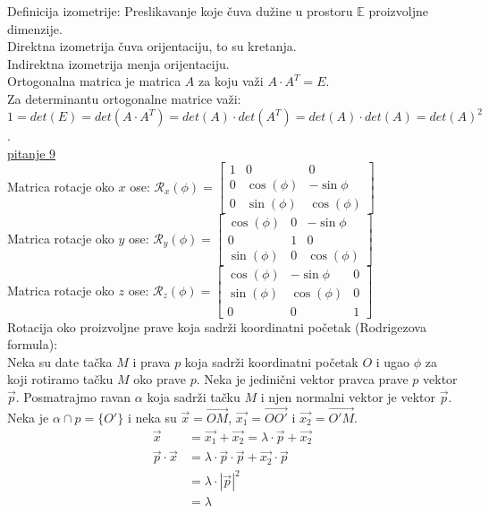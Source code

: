 \documentclass[12pt]{article}
\newcommand{\vek}[1]{\overrightarrow{#1}}
\begin{document}
Definicija izometrije: Preslikavanje koje čuva dužine u prostoru
$\mathbb{E}$ proizvoljne dimenzije.\\
Direktna izometrija čuva orijentaciju, to su kretanja.\\
Indirektna izometrija menja orijentaciju.\\
Ortogonalna matrica je matrica $A$ za koju važi $A\cdot A^T=E$.\\
Za determinantu ortogonalne matrice važi:\\
$1=det(E)=det(A\cdot A^T)=det(A)\cdot det(A^T)=det(A)\cdot det(A)=det(A)^2$.\\
\hyperref[subsec:pitanje_9]{pitanje 9}\\
Matrica rotacje oko $x$ ose: $\mathcal{R}_x(\phi)=\begin{bmatrix}
        1 & 0          & 0           \\
        0 & \cos(\phi) & -\sin{\phi} \\
        0 & \sin(\phi) & \cos(\phi)
    \end{bmatrix}$\\[0.5cm]
Matrica rotacje oko $y$ ose: $\mathcal{R}_y(\phi)=\begin{bmatrix}
        \cos(\phi) & 0 & -\sin{\phi} \\
        0          & 1 & 0           \\
        \sin(\phi) & 0 & \cos(\phi)
    \end{bmatrix}$\\[0.5cm]
Matrica rotacje oko $z$ ose: $\mathcal{R}_z(\phi)=\begin{bmatrix}
        \cos(\phi) & -\sin{\phi} & 0 \\
        \sin(\phi) & \cos(\phi)  & 0 \\
        0          & 0           & 1
    \end{bmatrix}$\\[0.5cm]
Rotacija oko proizvoljne prave koja sadrži koordinatni početak (Rodrigezova formula):\\
Neka su date tačka $M$ i prava $p$ koja sadrži koordinatni početak $O$ i ugao $\phi$ za koji rotiramo tačku $M$ oko prave $p$.
Neka je jedinični vektor pravca prave $p$ vektor $\vek{p}$.
Posmatrajmo ravan $\alpha$ koja sadrži tačku $M$ i njen normalni vektor je vektor $\vek{p}$.
Neka je $\alpha\cap p =\{O'\}$ i neka su $\vek{x}=\vek{OM}$, $\vek{x_1}=\vek{OO'}$ i $\vek{x_2}=\vek{O'M}$.
\begin{align*}
    \vek{x}             & =\vek{x_1}+\vek{x_2} = \lambda\cdot\vek{p}+\vek{x_2}   \\
    \vek{p}\cdot\vek{x} & =\lambda\cdot\vek{p}\cdot\vek{p}+\vek{x_2}\cdot\vek{p} \\
                        & =\lambda\cdot|\vek{p}|^2                               \\
                        & =\lambda                                               \\
\end{align*}
\end{document}
